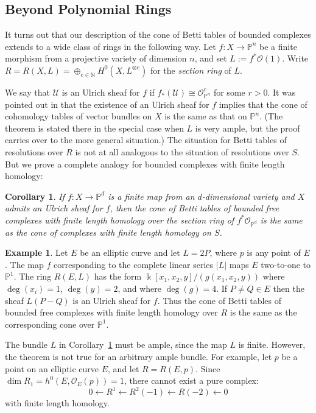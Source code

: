 \documentclass[12pt]{amsart}
\newtheorem{cor}[lemma]{Corollary}
\theoremstyle{definition}
\newtheorem{example}[lemma]{Example}
\theoremstyle{remark}
\newcommand{\kk}{\Bbbk}
\newcommand{\PP}{\mathbb{P}}
\newcommand{\cO}{\mathcal{O}}
\newcommand{\cU}{\mathcal{U}}
\newcommand{\defi}[1]{\textsf{#1}} %
\renewcommand{\P}{{\mathbb P}}
\begin{document}
\subsection*{Beyond Polynomial Rings}
It turns out that our description of the cone of Betti tables of bounded complexes
extends to a wide class of rings in the following way. Let $f:X\to \PP^{n}$ be a finite
morphism from a projective variety of dimension $n$, and set $L:=f^*\cO(1)$. 
Write $R=R(X,L)=\oplus_{e\in \mathbb N} H^0(X,L^{\otimes e})$ for the \emph{section ring}
of $L$.

We say that $\cU$ is an \defi{Ulrich sheaf} for $f$ if $f_*(\cU)\cong \cO_{\PP^n}^r$ for some $r>0$.  It was pointed out in \cite[Theorem~5]{eis-schrey-abel} that the existence of an Ulrich sheaf for $f$ implies that  the cone of cohomology tables of vector bundles on $X$ is the same as that on $\PP^{n}$. (The theorem is stated there in the special case when $L$ is very ample, but the proof
carries over to the more general situation.) The situation for Betti tables of resolutions over $R$ is not at all analogous to the situation of resolutions over $S$. But we prove a complete analogy for bounded complexes with finite length homology:

\begin{cor}\label{cor:isom cones}
If $f:X\to \P^{d}$ is a  finite map from an $d$-dimensional variety and $X$ admits an Ulrich sheaf for $f$, then the cone of Betti tables
of bounded free complexes with finite length homology over  the section ring
of $f^{*}\cO_{\P^{d}}$ is the same
as the cone of complexes with finite length homology on $S$. 
\end{cor}

\begin{example}\label{ex:elliptic}
Let $E$ be an elliptic curve and let $L=2P$, where $p$ is any point of $E$.  The map $f$ corresponding to the complete
linear series $|L|$ maps $E$ two-to-one to $\P^{1}$. The ring $R(E,L)$ has the form
$\kk[x_1,x_2,y]/(g(x_{1},x_{2},y))$  where $\deg(x_i)=1$, $\deg(y)=2$, and where $\deg(g)=4$.
If $P\neq Q\in E$ then the sheaf $L(P-Q)$ is an Ulrich sheaf for $f$. Thus the cone of
Betti tables of bounded free complexes with finite length homology over $R$ is the same
as the corresponding cone over $\P^{1}$.

The bundle $L$ in Corollary~\ref{cor:isom cones} must be ample, since the map $L$ is finite.  However, the theorem is not true for an arbitrary ample bundle.  For example, let $p$ be a point on an elliptic curve $E$, and let $R=R(E,p)$.  Since $\dim R_1=h^0(E,\cO_E(p))=1$, there cannot exist a pure complex:
\[
0\gets R^1\gets R^2(-1)\gets R(-2)\gets 0
\]
with finite length homology.
\end{example}
\end{document}
